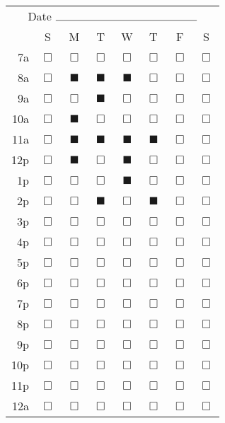 \begin{tabular}{rccccccc}
\multicolumn{8}{c}{Date $\rule{5cm}{0.15mm}$} \\
     & S & M & T & W & T & F & S \\
7a & $\Box$ & $\Box$ & $\Box$ & $\Box$ & $\Box$ & $\Box$ & $\Box$ \\
8a & $\Box$ & $\blacksquare$ & $\blacksquare$ & $\blacksquare$ & $\Box$ & $\Box$ & $\Box$ \\
9a & $\Box$ & $\Box$ & $\blacksquare$ & $\Box$ & $\Box$ & $\Box$ & $\Box$ \\
10a & $\Box$ & $\blacksquare$ & $\Box$ & $\Box$ & $\Box$ & $\Box$ & $\Box$ \\
11a & $\Box$ & $\blacksquare$ & $\blacksquare$ & $\blacksquare$ & $\blacksquare$ & $\Box$ & $\Box$ \\
12p & $\Box$ & $\blacksquare$ & $\Box$ & $\blacksquare$ & $\Box$ & $\Box$ & $\Box$ \\
1p & $\Box$ & $\Box$ & $\Box$ & $\blacksquare$ & $\Box$ & $\Box$ & $\Box$ \\
2p & $\Box$ & $\Box$ & $\blacksquare$ & $\Box$ & $\blacksquare$ & $\Box$ & $\Box$ \\
3p & $\Box$ & $\Box$ & $\Box$ & $\Box$ & $\Box$ & $\Box$ & $\Box$ \\
4p & $\Box$ & $\Box$ & $\Box$ & $\Box$ & $\Box$ & $\Box$ & $\Box$ \\
5p & $\Box$ & $\Box$ & $\Box$ & $\Box$ & $\Box$ & $\Box$ & $\Box$ \\
6p & $\Box$ & $\Box$ & $\Box$ & $\Box$ & $\Box$ & $\Box$ & $\Box$ \\
7p & $\Box$ & $\Box$ & $\Box$ & $\Box$ & $\Box$ & $\Box$ & $\Box$ \\
8p & $\Box$ & $\Box$ & $\Box$ & $\Box$ & $\Box$ & $\Box$ & $\Box$ \\
9p & $\Box$ & $\Box$ & $\Box$ & $\Box$ & $\Box$ & $\Box$ & $\Box$ \\
10p & $\Box$ & $\Box$ & $\Box$ & $\Box$ & $\Box$ & $\Box$ & $\Box$ \\
11p & $\Box$ & $\Box$ & $\Box$ & $\Box$ & $\Box$ & $\Box$ & $\Box$ \\
12a & $\Box$ & $\Box$ & $\Box$ & $\Box$ & $\Box$ & $\Box$ & $\Box$
\end{tabular}